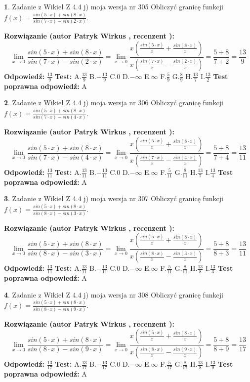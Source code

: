 \documentclass[12pt, a4paper]{article}
\theoremstyle{definition} %
\newtheorem{zad}{}
\newcommand{\zadStart}[1]{\begin{zad}#1\newline}
\newcommand{\zadStop}{\end{zad}}
\newcommand{\rozwStart}[2]{\noindent \textbf{Rozwiązanie (autor #1 , recenzent #2): }\newline}
\newcommand{\rozwStop}{\newline}
\newcommand{\odpStart}{\noindent \textbf{Odpowiedź:}\newline}
\newcommand{\odpStop}{\newline}
\newcommand{\testStart}{\noindent \textbf{Test:}\newline}
\newcommand{\testStop}{\newline}
\newcommand{\kluczStart}{\noindent \textbf{Test poprawna odpowiedź:}\newline}
\newcommand{\kluczStop}{\newline}
\begin{document}
\zadStart{Zadanie z Wikieł Z 4.4 j) moja wersja nr 305}
Obliczyć granicę funkcji $f(x)=\frac{sin(5\cdot x) +sin(8\cdot x)}{sin(7\cdot x) -sin(2\cdot x)}$.
\zadStop
\rozwStart{Patryk Wirkus}{}
$$\lim\limits_{x\to 0}\frac{sin(5\cdot x) +sin(8\cdot x)}{sin(7\cdot x) -sin(2\cdot x)}=\lim\limits_{x\to 0}\frac{x(\frac{sin(5\cdot x)}{x}+\frac{sin(8\cdot x)}{x})}{x(\frac{sin(7\cdot x)}{x}-\frac{sin(2\cdot x)}{x})}=\frac{5+8}{7+2} = \frac{13}{9}$$
\rozwStop
\odpStart
$\frac{13}{9}$
\odpStop
\testStart
A.$\frac{13}{9}$
B.$-\frac{13}{9}$
C.$0$
D.$-\infty$
E.$\infty$
F.$\frac{5}{9}$
G.$\frac{8}{9}$
H.$\frac{13}{7}$
I.$\frac{13}{2}$
\testStop
\kluczStart
A
\kluczStop



\zadStart{Zadanie z Wikieł Z 4.4 j) moja wersja nr 306}
Obliczyć granicę funkcji $f(x)=\frac{sin(5\cdot x) +sin(8\cdot x)}{sin(7\cdot x) -sin(4\cdot x)}$.
\zadStop
\rozwStart{Patryk Wirkus}{}
$$\lim\limits_{x\to 0}\frac{sin(5\cdot x) +sin(8\cdot x)}{sin(7\cdot x) -sin(4\cdot x)}=\lim\limits_{x\to 0}\frac{x(\frac{sin(5\cdot x)}{x}+\frac{sin(8\cdot x)}{x})}{x(\frac{sin(7\cdot x)}{x}-\frac{sin(4\cdot x)}{x})}=\frac{5+8}{7+4} = \frac{13}{11}$$
\rozwStop
\odpStart
$\frac{13}{11}$
\odpStop
\testStart
A.$\frac{13}{11}$
B.$-\frac{13}{11}$
C.$0$
D.$-\infty$
E.$\infty$
F.$\frac{5}{11}$
G.$\frac{8}{11}$
H.$\frac{13}{7}$
I.$\frac{13}{4}$
\testStop
\kluczStart
A
\kluczStop



\zadStart{Zadanie z Wikieł Z 4.4 j) moja wersja nr 307}
Obliczyć granicę funkcji $f(x)=\frac{sin(5\cdot x) +sin(8\cdot x)}{sin(8\cdot x) -sin(3\cdot x)}$.
\zadStop
\rozwStart{Patryk Wirkus}{}
$$\lim\limits_{x\to 0}\frac{sin(5\cdot x) +sin(8\cdot x)}{sin(8\cdot x) -sin(3\cdot x)}=\lim\limits_{x\to 0}\frac{x(\frac{sin(5\cdot x)}{x}+\frac{sin(8\cdot x)}{x})}{x(\frac{sin(8\cdot x)}{x}-\frac{sin(3\cdot x)}{x})}=\frac{5+8}{8+3} = \frac{13}{11}$$
\rozwStop
\odpStart
$\frac{13}{11}$
\odpStop
\testStart
A.$\frac{13}{11}$
B.$-\frac{13}{11}$
C.$0$
D.$-\infty$
E.$\infty$
F.$\frac{5}{11}$
G.$\frac{8}{11}$
H.$\frac{13}{8}$
I.$\frac{13}{3}$
\testStop
\kluczStart
A
\kluczStop



\zadStart{Zadanie z Wikieł Z 4.4 j) moja wersja nr 308}
Obliczyć granicę funkcji $f(x)=\frac{sin(5\cdot x) +sin(8\cdot x)}{sin(8\cdot x) -sin(9\cdot x)}$.
\zadStop
\rozwStart{Patryk Wirkus}{}
$$\lim\limits_{x\to 0}\frac{sin(5\cdot x) +sin(8\cdot x)}{sin(8\cdot x) -sin(9\cdot x)}=\lim\limits_{x\to 0}\frac{x(\frac{sin(5\cdot x)}{x}+\frac{sin(8\cdot x)}{x})}{x(\frac{sin(8\cdot x)}{x}-\frac{sin(9\cdot x)}{x})}=\frac{5+8}{8+9} = \frac{13}{17}$$
\rozwStop
\odpStart
$\frac{13}{17}$
\odpStop
\testStart
A.$\frac{13}{17}$
B.$-\frac{13}{17}$
C.$0$
D.$-\infty$
E.$\infty$
F.$\frac{5}{17}$
G.$\frac{8}{17}$
H.$\frac{13}{8}$
I.$\frac{13}{9}$
\testStop
\kluczStart
A
\kluczStop
\end{document}
